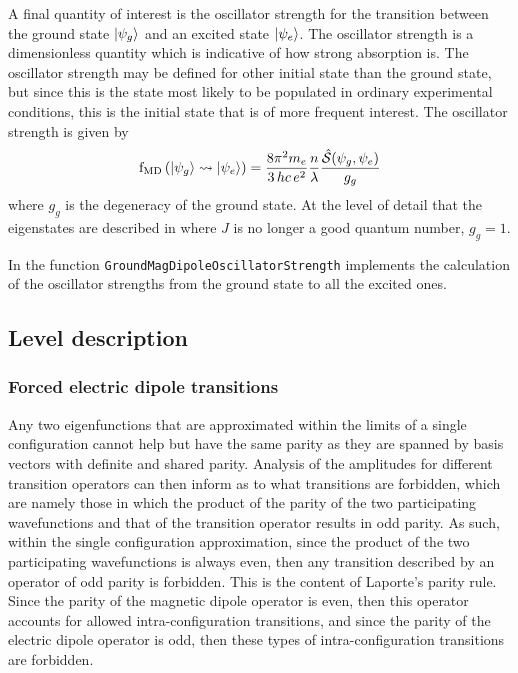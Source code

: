 \documentclass{article}
\newcommand{\codetext}[1]{{\color{BlueViolet} \texttt{#1}}}
\begin{document}
 
 
A final quantity of interest is the oscillator strength for the transition between the ground state $|\psi_g\rangle$ and an excited state $|\psi_e\rangle$. The oscillator strength is a dimensionless quantity which is indicative of how strong absorption is. The oscillator strength may be defined for other initial state than the ground state, but since this is the state most likely to be populated in ordinary experimental conditions, this is the initial state that is of more frequent interest. The oscillator strength is given by \cite{carnall_spectral_1965}
\begin{equation}
	\text{f}_\text{MD}\left(|\psi_g\rangle \rightsquigarrow |\psi_e\rangle\right) = \frac{8 \pi^2 m_{e}}{3\,hc\,e^2} 
	\frac{n}{\lambda}
	\frac{\hat{\mathcal{S}}(\psi_g,\psi_e)}{g_g}
\end{equation}
where $g_g$ is the degeneracy of the ground state. At the level of detail that the eigenstates are described in \qlanth where $J$ is no longer a good quantum number, $g_g = 1$. 

In \qlanth the function \codetext{GroundMagDipoleOscillatorStrength} implements the calculation of the oscillator strengths from the ground state to all the excited ones.

 

\subsection{Level description}

\subsubsection{Forced electric dipole transitions}

Any two eigenfunctions that are approximated within the limits of a single configuration cannot help but have the same parity as they are spanned by basis vectors with definite and shared parity. Analysis of the amplitudes for different transition operators can then inform as to what transitions are forbidden, which are namely those in which the product of the parity of the two participating wavefunctions and that of the transition operator results in odd parity. As such, within the single configuration approximation, since the product of the two participating wavefunctions is always even, then any transition described by an operator of odd parity is forbidden. This is the content of Laporte's parity rule. Since the parity of the magnetic dipole operator is even, then this operator accounts for allowed intra-configuration transitions, and since the parity of the electric dipole operator is odd, then these types of intra-configuration transitions are forbidden.
\end{document}
